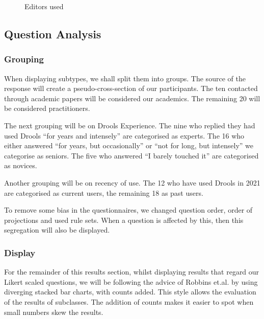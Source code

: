 \begin{figure}
    \centering
    \caption{Editors used}
    \label{fig:editorUsage}
\end{figure}

\subsection{Question Analysis}

\subsubsection{Grouping}
When displaying subtypes, we shall split them into groups.
The source of the response will create a pseudo-cross-section of our participants.
The ten contacted through academic papers will be considered our academics.
The remaining 20 will be considered practitioners.

The next grouping will be on Drools Experience.
The nine who replied they had used Drools ``for years and intensely'' are categorised as experts.
The 16 who either answered ``for years, but occasionally'' or ``not for long, but intensely'' we categorise as seniors.
The five who answered ``I barely touched it'' are categorised as novices.

Another grouping will be on recency of use.
The 12 who have used Drools in 2021 are categorised as current users, the remaining 18 as past users.

To remove some bias in the questionnaires, we changed question order, order of projections and used rule sets.
When a question is affected by this, then this segregation will also be displayed.

\subsubsection{Display}
For the remainder of this results section, whilst displaying results that regard our Likert scaled questions, we will be following the advice of Robbins et.al.\cite{robbins2011plotting} by using diverging stacked bar charts, with counts added.
This style allows the evaluation of the results of subclasses.
The addition of counts makes it easier to spot when small numbers skew the results.

